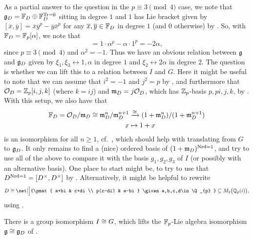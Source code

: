 \begin{remark}
  As a partial answer to the question in the $p \equiv 3 \pmod{4}$ case, we note that $\mathfrak{g}_{D} = \mathbb{F}_{D} \oplus \mathbb{F}_{D}^{\operatorname{Tr} = 0}$ sitting in degree $1$ and $1$ has Lie bracket given by $[\overline{x},\overline{y}] = \overline{x}\overline{y}^{p} - \overline{y}\overline{x}^{p}$ for any $\overline{x},\overline{y} \in \mathbb{F}_{D}$ in degree $1$ (and $0$ otherwise) by \cite[(6.6)]{Sor}. So, with $\mathbb{F}_{D} = \mathbb{F}_{p}[\alpha]$, we note that
  \begin{equation*}
    [1,\alpha] = 1\cdot\alpha^{p} - \alpha\cdot1^{p} = -2\alpha,
  \end{equation*}
  since $p \equiv 3 \pmod{4}$ and $\alpha^{2} = -1$. Thus we have an obvious relation between $\mathfrak{g}$ and $\mathfrak{g}_{D}$ given by $\xi_{1},\xi_{3} \leftrightarrow 1,\alpha$ in degree $1$ and $\xi_{2} \leftrightarrow 2\alpha$ in degree $2$. The question is whether we can lift this to a relation between $I$ and $G$. Here it might be useful to note that we can assume that $i^{2} = -1$ and $j^{2} = p$ by \cite[Thm.~12.1.5]{Voight}, and furthermore that $\mathcal{O}_{D}=\mathbb{Z}_{p}[i,j,k]$ (where $k=ij$) and $\mathfrak{m}_{D} = j\mathcal{O}_{D}$, which has $\mathbb{Z}_{p}$-basis $p,pi,j,k$, by \cite[Thm.13.1.6]{Voight}. With this setup, we also have that
  \begin{align*}
    \mathbb{F}_{D} = \mathcal{O}_{D}/\mathfrak{m}_{D} \cong \mathfrak{m}_{D}^{n}/\mathfrak{m}_{D}^{n+1} &\xrightarrow{\cong} (1+\mathfrak{m}_{D}^{n})/(1+\mathfrak{m}_{D}^{n+1}) \\
    x &\mapsto 1+x
  \end{align*}
  is an isomorphism for all $n\geq1$, cf.\ \cite[13.5.8]{Voight}, which should help with translating from $G$ to $\mathfrak{g}_{D}$. It only remains to find a (nice) ordered basis of $(1+\mathfrak{m}_{D})^{\operatorname{Nrd} = 1}$, and try to use all of the above to compare it with the basis $g_{1},g_{2},g_{3}$ of $I$ (or possibly with an alternative basis). One place to start might be, to try to use that $D^{\operatorname{Nrd} = 1} = [D^{\times},D^{\times}]$ by \cite[Exc.~30 of Chap.~7]{Voight}. Alternatively, it might be helpful to rewrite
  \begin{equation*}
    D \iso \set[\Big]{\pmat{ a+bi & c+di \\ p(c-di) & a-bi } \given a,b,c,d\in\Q_{p} } \subseteq M_{2}\bigl( \Q_{p}(i) \bigr),
  \end{equation*}
  using \cite[Cor.~13.3.14]{Voight}.
\end{remark}

\begin{conjecture}
  There is a group isomorphism $I \cong G$, which lifts the $\mathbb{F}_{p}$-Lie algebra isomorphism $\mathfrak{g} \cong \mathfrak{g}_{D}$ of .
\end{conjecture}


